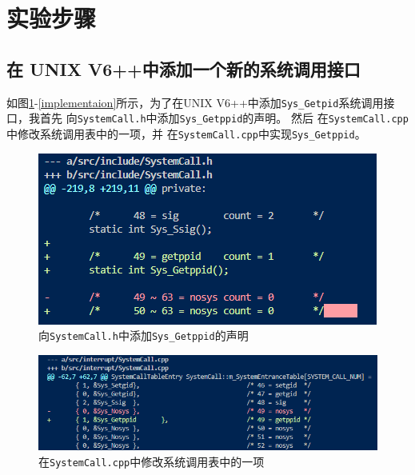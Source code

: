 \section{实验步骤}
\subsection{在 UNIX V6++中添加一个新的系统调用接口}
如图\ref{declear}-\ref{implementaion}所示，为了在UNIX V6++中添加\texttt{Sys\_Getpid}系统调用接口，我首先
向\texttt{SystemCall.h}中添加\texttt{Sys\_Getppid}的声明。
然后
在\texttt{SystemCall.cpp}中修改系统调用表中的一项，并
在\texttt{SystemCall.cpp}中实现\texttt{Sys\_Getppid}。
\begin{figure}[!htbp]
    \centering
    \includegraphics[scale=1]{images/declear.png}
    \caption{向\texttt{SystemCall.h}中添加\texttt{Sys\_Getppid}的声明}\label{declear}
\end{figure}

\begin{figure}[!htbp]
    \centering
    \includegraphics[width=\textwidth]{images/entry.png}
    \caption{在\texttt{SystemCall.cpp}中修改系统调用表中的一项}\label{entry}
\end{figure}

